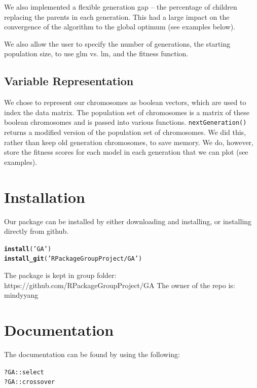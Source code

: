\documentclass{article}\usepackage[]{graphicx}\usepackage[]{color}
\makeatletter
\newcommand{\hlstr}[1]{\textcolor[rgb]{0.192,0.494,0.8}{#1}}%
\newcommand{\hlopt}[1]{\textcolor[rgb]{0,0,0}{#1}}%
\newcommand{\hlstd}[1]{\textcolor[rgb]{0.345,0.345,0.345}{#1}}%
\newcommand{\hlkwd}[1]{\textcolor[rgb]{0.737,0.353,0.396}{\textbf{#1}}}%
\newenvironment{kframe}{%
 \def\at@end@of@kframe{}%
 \ifinner\ifhmode%
  \def\at@end@of@kframe{\end{minipage}}%
  \begin{minipage}{\columnwidth}%
 \fi\fi%
 \def\FrameCommand##1{\hskip\@totalleftmargin \hskip-\fboxsep
 \colorbox{shadecolor}{##1}\hskip-\fboxsep
     \hskip-\linewidth \hskip-\@totalleftmargin \hskip\columnwidth}%
 \MakeFramed {\advance\hsize-\width
   \@totalleftmargin\z@ \linewidth\hsize
   \@setminipage}}%
 {\par\unskip\endMakeFramed%
 \at@end@of@kframe}
\newenvironment{knitrout}{}{} %
\makeatother
\begin{document}
We also implemented a flexible generation gap -- the percentage of children replacing the parents in each generation. This had a large impact on the convergence of the algorithm to the global optimum (see examples below).

We also allow the user to specify the number of generations, the starting population size, to use glm vs. lm, and the fitness function.

\subsection*{Variable Representation}

We chose to represent our chromosomes as boolean vectors, which are used to index the data matrix. The population set of chromosomes is a matrix of these boolean chromosomes and is passed into various functions. \texttt{nextGeneration()} returns a modified version of the population set of chromosomes. We did this, rather than keep old generation chromosomes, to save memory. We do, however, store the fitness scores for each model in each generation that we can plot (see examples).

\section*{Installation}

Our package can be installed by either downloading and installing, or installing directly from github.

\begin{knitrout}
\color{fgcolor}\begin{kframe}
\begin{alltt}
\hlkwd{install}\hlstd{(}\hlstr{'GA'}\hlstd{)}
\hlkwd{install_git}\hlstd{(}\hlstr{'RPackageGroupProject/GA'}\hlstd{)}
\end{alltt}
\end{kframe}
\end{knitrout}

The package is kept in group folder: https://github.com/RPackageGroupProject/GA
The owner of the repo is: mindyyang

\section*{Documentation}

The documentation can be found by using the following:
\begin{knitrout}
\color{fgcolor}\begin{kframe}
\begin{alltt}
\hlopt{?}\hlstd{GA}\hlopt{::}\hlstd{select}
\hlopt{?}\hlstd{GA}\hlopt{::}\hlstd{crossover}
\end{alltt}
\end{kframe}
\end{knitrout}
\end{document}
